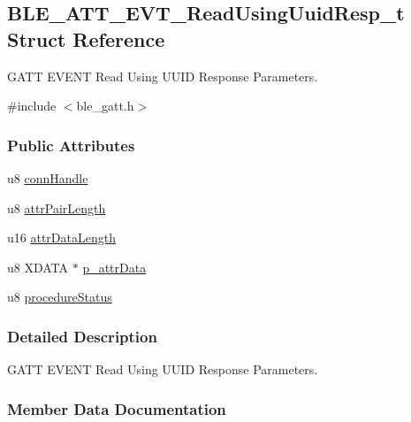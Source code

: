 \hypertarget{struct_b_l_e___a_t_t___e_v_t___read_using_uuid_resp__t}{}\subsection{B\+L\+E\+\_\+\+A\+T\+T\+\_\+\+E\+V\+T\+\_\+\+Read\+Using\+Uuid\+Resp\+\_\+t Struct Reference}
\label{struct_b_l_e___a_t_t___e_v_t___read_using_uuid_resp__t}


G\+A\+TT E\+V\+E\+NT Read Using U\+U\+ID Response Parameters.  




{\ttfamily \#include $<$ble\+\_\+gatt.\+h$>$}

\subsubsection*{Public Attributes}
\begin{DoxyCompactItemize}
\item 
u8 \hyperlink{struct_b_l_e___a_t_t___e_v_t___read_using_uuid_resp__t_a7878a8974cfae4f4ab01f1ecfac046b9}{conn\+Handle}
\item 
u8 \hyperlink{struct_b_l_e___a_t_t___e_v_t___read_using_uuid_resp__t_a30da87badb658a1f2bc6dc281d7ba8d4}{attr\+Pair\+Length}
\item 
u16 \hyperlink{struct_b_l_e___a_t_t___e_v_t___read_using_uuid_resp__t_ab63bdac57d4168d03ef3dd5ae783f6ba}{attr\+Data\+Length}
\item 
u8 X\+D\+A\+TA $\ast$ \hyperlink{struct_b_l_e___a_t_t___e_v_t___read_using_uuid_resp__t_a971d83ef8d2bcfd1442c357372956a0c}{p\+\_\+attr\+Data}
\item 
u8 \hyperlink{struct_b_l_e___a_t_t___e_v_t___read_using_uuid_resp__t_a306bf84cc04a0db1742f955c21e597a1}{procedure\+Status}
\end{DoxyCompactItemize}


\subsubsection{Detailed Description}
G\+A\+TT E\+V\+E\+NT Read Using U\+U\+ID Response Parameters. 

\subsubsection{Member Data Documentation}

